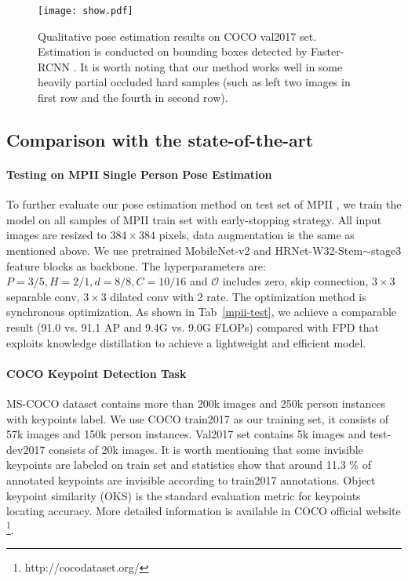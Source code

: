 \documentclass[journal]{IEEEtran}
\begin{document}
\begin{figure*}
	
	\centering
\texttt{[image: show.pdf]}
	\caption{Qualitative pose estimation results on COCO val2017 set. Estimation is conducted on bounding boxes detected by Faster-RCNN \cite{ren2015faster}. It is worth noting that our method works well in some heavily partial occluded hard samples (such as left two images in first row and the fourth in second row).
	}
	
	\label{coco_results}
\end{figure*}

\subsection{Comparison with the state-of-the-art}
\label{state-of-the-art}
\paragraph{Testing on MPII Single Person Pose Estimation} To further evaluate our pose estimation method on test set of MPII \cite{andriluka20142d}, we train the model on all samples of MPII train set with early-stopping strategy. All input images are resized to $384\times384$ pixels, data augmentation is the same as mentioned above. We use pretrained MobileNet-v2 and HRNet-W32-Stem$\sim$stage3 feature blocks as backbone. The hyperparameters are: $P=3/5,H=2/1,d=8/8,C=10/16$ and $\mathcal{O}$ includes zero, skip connection, $3\times3$ separable conv, $3\times3$ dilated conv with 2 rate. The optimization method is synchronous optimization. As shown in Tab~\ref{mpii-test}, we achieve a comparable result (91.0 vs. 91.1 AP and 9.4G vs. 9.0G FLOPs) compared with FPD \cite{Zhang2018FastHP} that exploits knowledge distillation to achieve a lightweight and efficient model.

\paragraph{COCO Keypoint Detection Task} MS-COCO \cite{lin2014microsoft} dataset contains more than 200k images and 250k person instances with keypoints label. We use COCO train2017 as our training set, it consists of 57k images and 150k person instances. Val2017 set contains 5k images and test-dev2017 consists of 20k images. It is worth mentioning that some invisible keypoints are labeled on train set and statistics show that around 11.3 \% of annotated keypoints are invisible according to train2017 annotations. Object keypoint similarity (OKS) is the standard evaluation metric for keypoints locating accuracy. More detailed information is available in COCO official website \footnote{http://cocodataset.org/}.  
\end{document}
